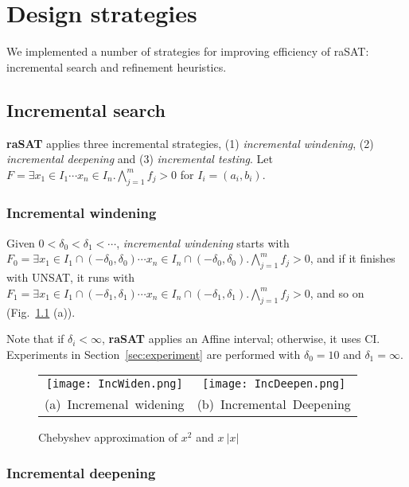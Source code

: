 \chapter{Design strategies}
We implemented a number of strategies for improving efficiency of raSAT: incremental search and refinement heuristics.
\section{Incremental search} \label{sec:incsearch}
{\bf raSAT} applies three incremental strategies, 
(1) {\em incremental windening}, (2) {\em incremental deepening} and (3) {\em incremental testing}. 
Let
$F = \exists x_1 \in I_1 \cdots x_n \in I_n. \bigwedge \limits_{j=1}^m f_j > 0$
for $I_i = (a_i,b_i)$. %

\subsection{Incremental windening}
Given $0 < \delta_0 < \delta_1 < \cdots$, 
{\em incremental windening} starts with 
$F_0 = \exists x_1 \in I_1 \cap (-\delta_0 , \delta_0) \cdots x_n \in I_n \cap (-\delta_0 , \delta_0). 
\bigwedge \limits_{j=1}^m f_j > 0$, 
and if it finishes with UNSAT, it runs with 
$F_1 = \exists x_1 \in I_1 \cap (-\delta_1 , \delta_1) \cdots x_n \in I_n \cap (-\delta_1 , \delta_1). 
\bigwedge \limits_{j=1}^m f_j > 0$, and so on (Fig.~\ref{fig:incwid} (a)). 

Note that if $\delta_i < \infty$, {\bf raSAT} applies an Affine interval; otherwise, 
it uses CI. 
Experiments in Section~\ref{sec:experiment} are performed 
with $\delta_0 = 10$ and $\delta_1 = \infty$.
\begin{figure}[ht]
\begin{minipage}[b]{1.0\linewidth}
\centering
\begin{tabular}{c@{\qquad}c}
\texttt{[image: IncWiden.png]} &
\texttt{[image: IncDeepen.png]} \\
\mbox{(a) Incremenal widening} & \mbox{(b) Incremental Deepening} \\
\end{tabular}
\caption{Chebyshev approximation of $x^2$ and $x~|x|$}
\label{fig:incwid}
\end{minipage}
\end{figure}


\subsection{Incremental deepening}

